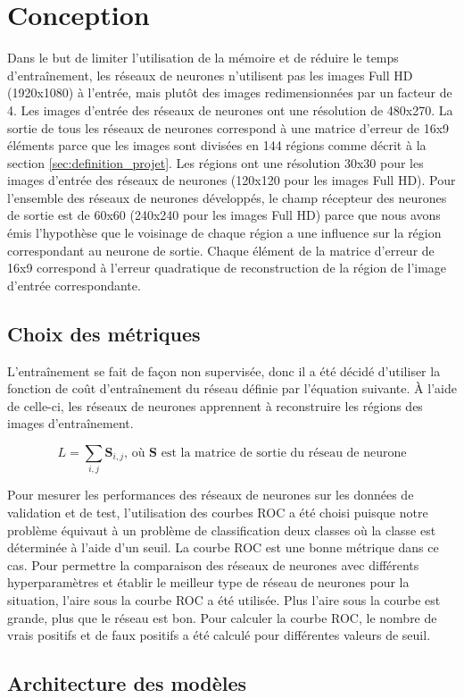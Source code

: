 \section{Conception}
    Dans le but de limiter l'utilisation de la mémoire et de réduire le temps d'entraînement, les réseaux de neurones n'utilisent pas les images Full HD (1920x1080) à l'entrée, mais plutôt des images redimensionnées par un facteur de 4. Les images d'entrée des réseaux de neurones ont une résolution de 480x270. La sortie de tous les réseaux de neurones correspond à une matrice d'erreur de 16x9 éléments parce que les images sont divisées en 144 régions comme décrit à la section \ref{sec:definition_projet}. Les régions ont une résolution 30x30 pour les images d'entrée des réseaux de neurones (120x120 pour les images Full HD). Pour l'ensemble des réseaux de neurones développés, le champ récepteur des neurones de sortie est de 60x60 (240x240 pour les images Full HD) parce que nous avons émis l'hypothèse que le voisinage de chaque région a une influence sur la région correspondant au neurone de sortie. Chaque élément de la matrice d'erreur de 16x9 correspond à l'erreur quadratique de reconstruction de la région de l'image d'entrée correspondante. 

\subsection{Choix des métriques}
    L'entraînement se fait de façon non supervisée, donc il  a été décidé d'utiliser la fonction de coût d'entraînement du réseau définie par l'équation suivante. À l'aide de celle-ci, les réseaux de neurones apprennent à reconstruire les régions des images d'entraînement.
    
    \begin{equation}
        L = \sum_{i,j} \mathbf{S}_{i,j} \text{, où } \mathbf{S} \text{ est la matrice de sortie du réseau de neurone}
    \end{equation}
    
    Pour mesurer les performances des réseaux de neurones sur les données de validation et de test, l'utilisation des courbes ROC a été choisi puisque notre problème équivaut à un problème de classification deux classes où la classe est déterminée à l'aide d'un seuil. La courbe ROC est une bonne métrique dans ce cas. Pour permettre la comparaison des réseaux de neurones avec différents hyperparamètres et établir le meilleur type de réseau de neurones pour la situation, l'aire sous la courbe ROC a été utilisée. Plus l'aire sous la courbe est grande, plus que le réseau est bon. Pour calculer la courbe ROC, le nombre de vrais positifs et de faux positifs a été calculé pour différentes valeurs de seuil.

\subsection{Architecture des modèles}